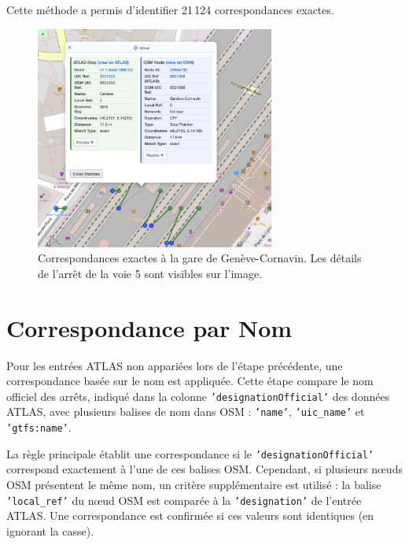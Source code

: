Cette méthode a permis d'identifier 21\,124 correspondances exactes.
\begin{figure}[h] 
    \centering
    \includegraphics[width=0.7\textwidth]{../figures/correspondances/exact_Cornavin.png}
    \caption[Correspondances exactes à Genève-Cornavin]{Correspondances exactes à la gare de Genève-Cornavin. Les détails de l'arrêt de la voie 5 sont visibles sur l'image.}
    \label{fig:exact_cornavin}
\end{figure}

\section{Correspondance par Nom}

Pour les entrées ATLAS non appariées lors de l’étape précédente, une correspondance basée sur le nom est appliquée. Cette étape compare le nom officiel des arrêts, indiqué dans la colonne \texttt{'designationOfficial'} des données ATLAS, avec plusieurs balises de nom dans OSM : \texttt{'name'}, \texttt{'uic\_name'} et \texttt{'gtfs:name'}.

La règle principale établit une correspondance si le \texttt{'designationOfficial'} correspond exactement à l’une de ces balises OSM. Cependant, si plusieurs nœuds OSM présentent le même nom, un critère supplémentaire est utilisé : la balise \texttt{'local\_ref'} du nœud OSM est comparée à la \texttt{'designation'} de l’entrée ATLAS. Une correspondance est confirmée si ces valeurs sont identiques (en ignorant la casse).

